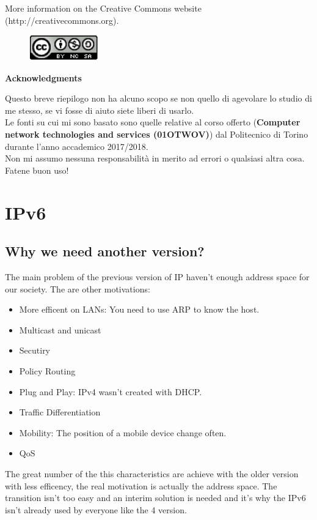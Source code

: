\documentclass[12pt]{article}
\begin{document}
\noindent More information on the Creative Commons website (http://creativecommons.org).

\begin{figure}[h!]
  \centering
  \includegraphics[width=3cm]{images/license.png}
\end{figure}

{\noindent \Large \textbf{Acknowledgments}\bigskip}

Questo breve riepilogo non ha alcuno scopo se non quello di agevolare lo studio di me stesso, se vi fosse di aiuto siete liberi di usarlo.\\
Le fonti su cui mi sono basato sono quelle relative al corso offerto (\textbf{Computer network technologies and services (01OTWOV)}) dal Politecnico di Torino durante l'anno accademico 2017/2018.\\
Non mi assumo nessuna responsabilità in merito ad errori o qualsiasi altra cosa. Fatene buon uso!
\newpage

\section{IPv6}
\subsection{Why we need another version?}
The main problem of the previous version of IP haven't enough address space for our society. The are other motivations:
\begin{itemize}
  \item More efficent on LANs: You need to use ARP to know the host.
  \item Multicast and unicast
  \item Secutiry
  \item Policy Routing
  \item Plug and Play: IPv4 wasn't created with DHCP.
  \item Traffic Differentiation
  \item Mobility: The position of a mobile device change often.
  \item QoS
\end{itemize}
The great number of the this characteristics are achieve with the older version with less efficency, the real motivation is actually the address space. The transition isn't too easy and an interim solution is needed and it's why the IPv6 isn't already used by everyone like the 4 version.
\end{document}
